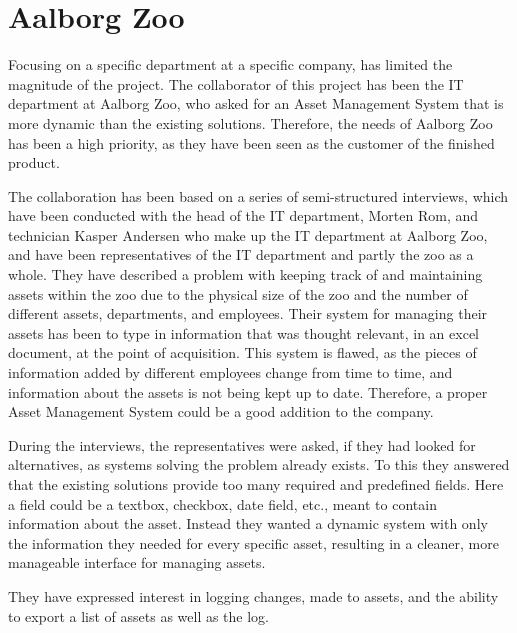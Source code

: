 \section{Aalborg Zoo}\label{ch:problemdefinition}
Focusing on a specific department at a specific company, has limited the magnitude of the project. The collaborator of this project has been the IT department at Aalborg Zoo, who asked for an Asset Management System that is more dynamic than the existing solutions. Therefore, the needs of Aalborg Zoo has been a high priority, as they have been seen as the customer of the finished product.
\par
The collaboration has been based on a series of semi-structured interviews, which have been conducted with the head of the IT department, Morten Rom, and technician Kasper Andersen who make up the IT department at Aalborg Zoo, and have been representatives of the IT department and partly the zoo as a whole. They have described a problem with keeping track of and maintaining assets within the zoo due to the physical size of the zoo and the number of different assets, departments, and employees. Their system for managing their assets has been to type in information that was thought relevant, in an excel document, at the point of acquisition. This system is flawed, as the pieces of information added by different employees change from time to time, and information about the assets is not being kept up to date. Therefore, a proper Asset Management System could be a good addition to the company.
\par
During the interviews, the representatives were asked, if they had looked for alternatives, as systems solving the problem already exists. To this they answered that the existing solutions provide too many required and predefined fields. Here a field could be a textbox, checkbox, date field, etc., meant to contain information about the asset. Instead they wanted a dynamic system with only the information they needed for every specific asset, resulting in a cleaner, more manageable interface for managing assets.
\par
They have expressed interest in logging changes, made to assets, and the ability to export a list of assets as well as the log. 






